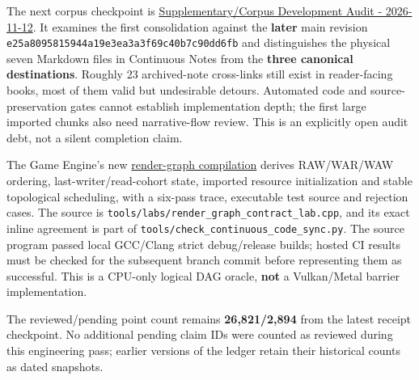 The next corpus checkpoint is \hyperref[appendix-28e6f216fdc7]{Supplementary/Corpus Development Audit - 2026-11-12}. It examines the first consolidation against the \textbf{later} main revision \texttt{e25a8095815944a19e3ea3a3f69c40b7c90dd6fb} and distinguishes the physical seven Markdown files in Continuous Notes from the \textbf{three canonical destinations}. Roughly 23 archived-note cross-links still exist in reader-facing books, most of them valid but undesirable detours. Automated code and source-preservation gates cannot establish implementation depth; the first large imported chunks also need narrative-flow review. This is an explicitly open audit debt, not a silent completion claim.

The Game Engine's new \hyperref[06-engine-ii-ch042-from-a-list-of-render-passes-to-a-proved-execution-order]{render-graph compilation} derives RAW/WAR/WAW ordering, last-writer/read-cohort state, imported resource initialization and stable topological scheduling, with a six-pass trace, executable test source and rejection cases. The source is \texttt{tools/labs/render\_graph\_contract\_lab.cpp}, and its exact inline agreement is part of \texttt{tools/check\_continuous\_code\_sync.py}. The source program passed local GCC/Clang strict debug/release builds; hosted CI results must be checked for the subsequent branch commit before representing them as successful. This is a CPU-only logical DAG oracle, \textbf{not} a Vulkan/Metal barrier implementation.

The reviewed/pending point count remains \textbf{26,821/2,894} from the latest receipt checkpoint. No additional pending claim IDs were counted as reviewed during this engineering pass; earlier versions of the ledger retain their historical counts as dated snapshots.
